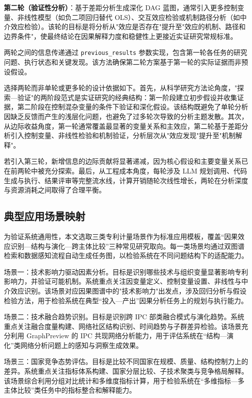 \textbf{第二轮（验证性分析）}：基于差距分析生成深化 DAG 蓝图，通常引入更多控制变量、非线性模型（如负二项回归替代 OLS）、交互效应检验或机制路径分析（如中介效应检验）。该轮的目标是将分析从"效应是否存在"提升至"效应的机制、路径和边界条件"，使最终结论在因果解释力度和稳健性上更接近实证研究常规标准。

两轮之间的信息传递通过 \texttt{previous\_results} 参数实现，包含第一轮各任务的研究问题、执行状态和关键发现。该方法确保第二轮方案基于第一轮的实际证据而非预设假设。

选择两轮而非单轮或更多轮的设计依据如下。首先，从科学研究方法论角度，"探索—验证"的两阶段范式是实证研究的经典结构：第一阶段建立初步假设并收集证据，第二阶段在控制混杂变量的条件下验证和深化假设\cite{basberg1987patents,trajtenberg1990penny}。该结构既避免了单轮分析因缺乏反馈而产生的浅层化问题，也避免了过多轮次导致的分析主题发散。其次，从边际收益角度，第一轮通常覆盖最显著的变量关系和主效应，第二轮基于差距分析引入控制变量、非线性检验和机制验证，分析层次从"效应发现"提升至"机制解释"。

若引入第三轮，新增信息的边际贡献将显著递减，因为核心假设和主要变量关系已在前两轮中被充分探索。最后，从工程成本角度，每轮涉及 LLM 规划调用、代码生成与执行、结果评审等完整流水线，计算开销随轮次线性增长，两轮在分析深度与资源消耗之间取得了合理平衡。

\subsection{典型应用场景映射}

为验证系统通用性，本文选取三类专利计量场景作为标准应用模板，覆盖“因果效应识别—结构与演化—跨主体比较”三种常见研究取向。每一类场景均通过双图谱检索和数据感知流程自动生成任务图，以检验系统在不同问题结构下的适配能力。

场景一：技术影响力驱动因素分析。目标是识别哪些技术与组织变量显著影响专利影响力，并验证可能机制。系统重点关注因变量定义、控制变量设置、非线性与中介效应识别。该场景对应因果图谱中的"技术影响力"出发点，涉及回归分析与假设检验方法\cite{basberg1987patents,trajtenberg1990penny}，用于检验系统在典型“投入—产出”因果分析任务上的规划与执行能力。

场景二：技术融合趋势识别。目标是识别跨 IPC 部类融合模式与演化趋势。系统重点关注融合度量构建、网络社区结构识别、时间趋势与子群差异检验。该场景充分利用 GraphPreview 的 IPC 共现网络分析能力\cite{daim2006forecasting,zhu2014patent}，用于评估系统在“结构—演化”类网络分析问题上的感知与洞察生成效果。

场景三：国家竞争态势评估。目标是比较不同国家在规模、质量、结构控制力上的差异。系统重点关注指标体系构建、国家分层比较、子技术聚类与竞争格局解释。该场景综合利用分组对比统计和多维度指标计算\cite{narin1997increasing,mejia2024patent}，用于检验系统在“多维指标—多主体比较”类任务中的指标整合和解释能力。


